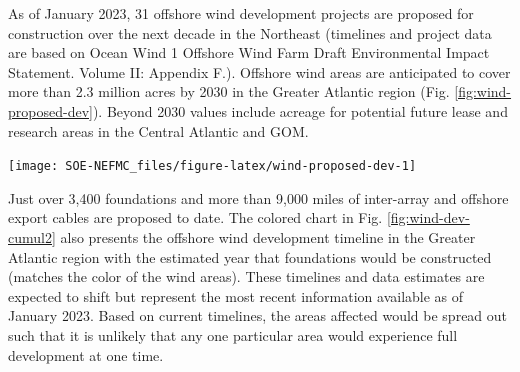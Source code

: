 \documentclass[
  10pt,
]{article}
\let\origfigure\figure
\let\endorigfigure\endfigure
\renewenvironment{figure}[1][2] {
    \expandafter\origfigure\expandafter[H]
} {
    \endorigfigure
}
\begin{document}
As of January 2023, 31 offshore wind development projects are proposed for construction over the next decade in the Northeast (timelines and project data are based on Ocean Wind 1 Offshore Wind Farm Draft Environmental Impact Statement. Volume II: Appendix F.). Offshore wind areas are anticipated to cover more than 2.3 million acres by 2030 in the Greater Atlantic region (Fig. \ref{fig:wind-proposed-dev}). Beyond 2030 values include acreage for potential future lease and research areas in the Central Atlantic and GOM.

\begin{figure}

{\centering \texttt{[image: SOE-NEFMC\_files/figure-latex/wind-proposed-dev-1]} 

}

\caption{Proposed wind development on the northeast shelf.}\label{fig:wind-proposed-dev}
\end{figure}

Just over 3,400 foundations and more than 9,000 miles of inter-array and offshore export cables are proposed to date. The colored chart in Fig. \ref{fig:wind-dev-cumul2} also presents the offshore wind development timeline in the Greater Atlantic region with the estimated year that foundations would be constructed (matches the color of the wind areas). These timelines and data estimates are expected to shift but represent the most recent information available as of January 2023. Based on current timelines, the areas affected would be spread out such that it is unlikely that any one particular area would experience full development at one time.
\end{document}
